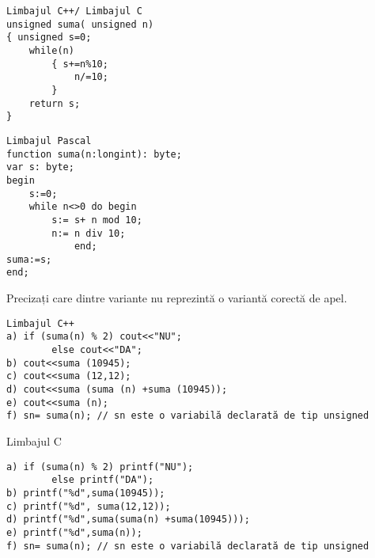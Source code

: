 \begin{verbatim}
Limbajul C++/ Limbajul C
unsigned suma( unsigned n)
{ unsigned s=0;
    while(n)
        { s+=n%10;
            n/=10;
        }
    return s;
}
\end{verbatim}

\begin{verbatim}
Limbajul Pascal
function suma(n:longint): byte;
var s: byte;
begin
    s:=0;
    while n<>0 do begin
        s:= s+ n mod 10;
        n:= n div 10;
            end;
suma:=s;
end;
\end{verbatim}

Precizați care dintre variante nu reprezintă o variantă corectă de apel.

\begin{verbatim}
Limbajul C++
a) if (suma(n) % 2) cout<<"NU";
        else cout<<"DA";
b) cout<<suma (10945);
c) cout<<suma (12,12);
d) cout<<suma (suma (n) +suma (10945));
e) cout<<suma (n);
f) sn= suma(n); // sn este o variabilă declarată de tip unsigned
\end{verbatim}

Limbajul C

\begin{verbatim}
a) if (suma(n) % 2) printf("NU");
        else printf("DA");
b) printf("%d",suma(10945));
c) printf("%d", suma(12,12));
d) printf("%d",suma(suma(n) +suma(10945)));
e) printf("%d",suma(n));
f) sn= suma(n); // sn este o variabilă declarată de tip unsigned
\end{verbatim}

